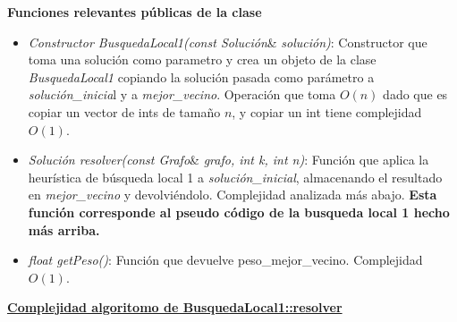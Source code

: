 \documentclass[10pt,a4paper]{article}
\begin{document}
\textbf{Funciones relevantes públicas de la clase}
\begin{itemize}
\item \textit{Constructor BusquedaLocal1(const Solución}\& \textit{solución)}: Constructor que toma una solución como parametro y crea un objeto de la clase \textit{BusquedaLocal1} copiando la solución pasada como parámetro a \textit{solución\_inicia}l y a \textit{mejor\_vecino}. Operación que toma $O(n)$ dado que es copiar un vector de ints de tamaño $n$, y copiar un int tiene complejidad $O(1)$.
\item \textit{Solución resolver(const Grafo}\& \textit{grafo, int k, int n)}: Función que aplica la heurística de búsqueda local 1 a \textit{solución\_inicial}, almacenando el resultado en \textit{mejor\_vecino} y devolviéndolo. Complejidad analizada más abajo. \textbf{Esta función corresponde al pseudo código de la busqueda local 1 hecho más arriba.}
\item \textit{float getPeso()}: Función que devuelve peso\_mejor\_vecino. Complejidad $O(1)$.
\end{itemize}

\noindent \textbf{\underline{Complejidad algoritomo de BusquedaLocal1::resolver}}
\end{document}
